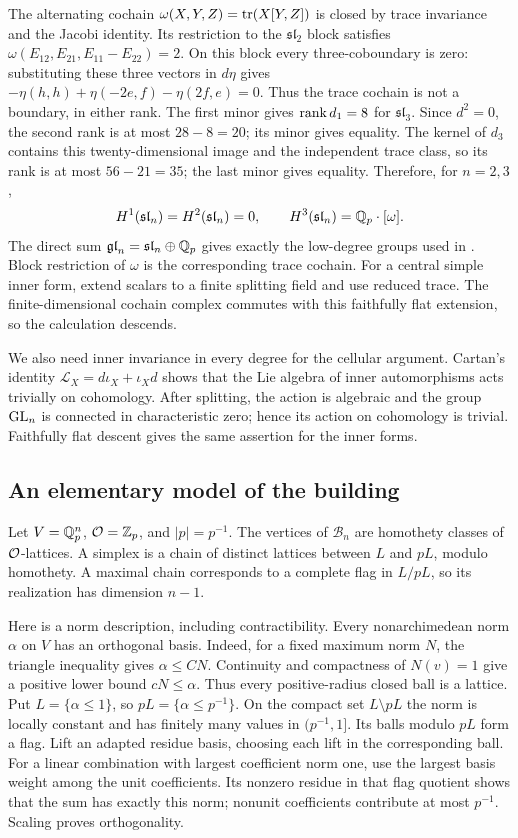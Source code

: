 The alternating cochain $\omega(X,Y,Z)=\operatorname{tr}(X[Y,Z])$ is closed by
trace invariance and the Jacobi identity.  Its restriction to the
$\mathfrak{sl}_2$ block satisfies
$\omega(E_{12},E_{21},E_{11}-E_{22})=2$.  On this block every
three-coboundary is zero: substituting these three vectors in $d\eta$
gives
$-\eta(h,h)+\eta(-2e,f)-\eta(2f,e)=0$.
Thus the trace cochain is not a boundary, in either rank.
The first minor gives $\operatorname{rank} d_1=8$ for $\mathfrak{sl}_3$.
Since $d^2=0$, the second rank is at most $28-8=20$; its minor gives
equality.  The kernel of $d_3$ contains this twenty-dimensional image
and the independent trace class, so its rank is at most $56-21=35$;
the last minor gives equality.  Therefore, for $n=2,3$,
\[
 H^1(\mathfrak{sl}_n)=H^2(\mathfrak{sl}_n)=0,
 \qquad H^3(\mathfrak{sl}_n)=\mathbb Q_p\cdot[\omega].
\]
The direct sum $\mathfrak{gl}_n=\mathfrak{sl}_n\oplus\mathbb Q_p$ gives
exactly the low-degree groups used in .
Block restriction of $\omega$ is the corresponding trace cochain.
For a central simple inner form, extend scalars to a finite splitting
field and use reduced trace.  The finite-dimensional cochain complex
commutes with this faithfully flat extension, so the calculation descends.

We also need inner invariance in every degree for the cellular argument.
Cartan's identity $\mathcal L_X=d\iota_X+\iota_Xd$ shows that the Lie
algebra of inner automorphisms acts trivially on cohomology.  After
splitting, the action is algebraic and the group $\operatorname{GL}_n$ is connected
in characteristic zero; hence its action on cohomology is trivial.
Faithfully flat descent gives the same assertion for the inner forms.

\subsection{An elementary model of the building}
\label{app:building}

Let $V=\mathbb Q_p^n$, $\mathcal O=\mathbb Z_p$, and $|p|=p^{-1}$.  The vertices of
$\mathcal B_n$ are homothety classes of $\mathcal O$-lattices.  A simplex is a
chain of distinct lattices between $L$ and $pL$, modulo homothety.
A maximal chain corresponds to a complete flag in $L/pL$, so its
realization has dimension $n-1$.

Here is a norm description, including contractibility.  Every
nonarchimedean norm $\alpha$ on $V$ has an orthogonal basis.
Indeed, for a fixed maximum norm $N$, the triangle inequality gives
$\alpha\le CN$.  Continuity and compactness of $N(v)=1$ give a positive
lower bound $cN\le\alpha$.  Thus every positive-radius closed ball is
a lattice.  Put $L=\{\alpha\le1\}$, so $pL=\{\alpha\le p^{-1}\}$.
On the compact set $L\setminus pL$ the norm is locally constant and
has finitely many values in $(p^{-1},1]$.  Its balls modulo $pL$ form
a flag.  Lift an adapted residue basis, choosing each lift in the
corresponding ball.  For a linear combination with largest coefficient
norm one, use the largest basis weight among the unit coefficients.
Its nonzero residue in that flag quotient shows that the sum has
exactly this norm; nonunit coefficients contribute at most $p^{-1}$.  Scaling
proves orthogonality.

